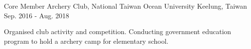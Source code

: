 

\begin{cventries}

  \cventry
    {Core Member  } %
    {Archery Club, National Taiwan Ocean University} %
    {Keelung, Taiwan} %
    {Sep. 2016 - Aug. 2018} %
    {
      \begin{cvitems} %
        \item {Organised club activity and competition. Conducting government education program to hold a archery camp for elementary school.}
      \end{cvitems}
    }
\end{cventries}
